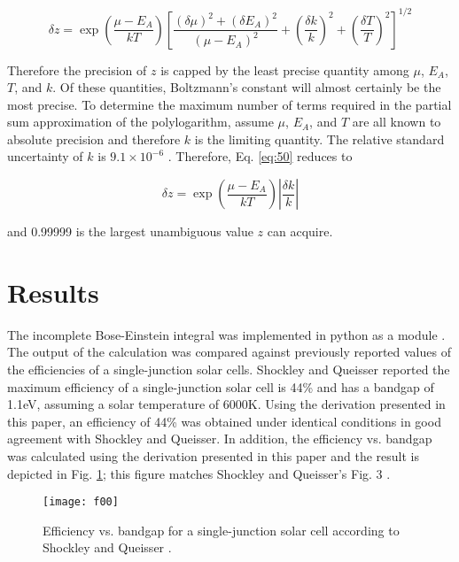 \documentclass[letterpaper,12pt]{article}
\begin{document}
\begin{equation} \label{eq:50}
\delta z = \exp \left( \frac{\mu - E_{A}}{kT} \right) \left[\frac{(\delta \mu)^{2} + (\delta E_{A})^{2}}{(\mu - E_{A})^{2}} + \left( \frac{\delta k}{k} \right)^{2} + \left( \frac{\delta T}{T} \right)^{2} \right]^{1/2}
\end{equation}

\noindent Therefore the precision of $z$ is capped by the least precise quantity among $\mu$, $E_{A}$, $T$, and $k$. Of these quantities, Boltzmann's constant will almost certainly be the most precise. To determine the maximum number of terms required in the partial sum approximation of the polylogarithm, assume $\mu$, $E_{A}$, and $T$ are all known to absolute precision and therefore $k$ is the limiting quantity. The relative standard uncertainty of $k$ is $9.1 \times 10^{-6}$ \cite{10.1103/RevModPhys.84.1527}. Therefore, Eq. \ref{eq:50} reduces to

\begin{equation} \label{eq:51}
\delta z = \exp \left( \frac{\mu - E_{A}}{kT} \right) \left| \frac{\delta k}{k} \right|
\end{equation}

\noindent and 0.99999 is the largest unambiguous value $z$ can acquire.


\section{Results}
The incomplete Bose-Einstein integral was implemented in python as a module \cite{}. The output of the calculation was compared against previously reported values of the efficiencies of a single-junction solar cells. Shockley and Queisser \cite{10.1063/1.1736034} reported the maximum efficiency of a single-junction solar cell is 44\% and has a bandgap of 1.1eV, assuming a solar temperature of 6000K. Using the derivation presented in this paper, an efficiency of 44\% was obtained under identical conditions in good agreement with Shockley and Queisser. In addition, the efficiency vs. bandgap was calculated using the derivation presented in this paper and the result is depicted in Fig. \ref{fig:00}; this figure matches Shockley and Queisser's Fig. 3 \cite{10.1063/1.1736034}.


\begin{figure}
\texttt{[image: f00]}
\caption{Efficiency vs. bandgap for a single-junction solar cell according to Shockley and Queisser \cite{10.1063/1.1736034}.}
\label{fig:00}
\end{figure}
\end{document}
